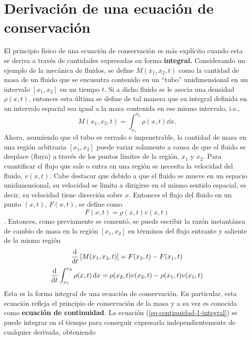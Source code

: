 \section{Derivación de una ecuación de conservación}
\label{sec:derivacion-continuidad}
El principio físico de una ecuación de conservación es más explícito cuando esta se deriva a través de cantidades expresadas en forma \textbf{integral.} Considerando un ejemplo de la mecánica de fluidos, se define $M(x_1,x_2,t)$ como la cantidad de masa de un fluido que se encuentra contenido en un ``tubo'' unidimensional en un intervalo  $[x_1,x_2]$ en un tiempo $t$. Si a dicho fluido se le asocia una densidad $\rho(x,t)$, entonces esta última se define de tal manera que su integral definida en un intervalo espacial sea igual a la masa contenida en ese mismo intervalo, i.e.,
\begin{equation}
	M(x_1, x_2, t) = \int_{x_1}^{x_2}\rho(x,t)\dd{x}.
\end{equation}
Ahora, asumiendo que el tubo es cerrado e impenetrable, la cantidad de masa en una región arbitraria $[x_1,x_2]$ puede variar solamente a causa de que el fluido se desplace (fluya) a través de los puntos límites de la región, $x_1$ y $x_2$. Para cuantificar el flujo que sale o entra en una región se necesita la velocidad del fluido, $v(x,t)$. Cabe destacar que debido a que el fluido se mueve en un espacio unidimensional, su velocidad se limita a dirigirse en el mismo sentido espacial, es decir, su velocidad tiene dirección sobre $x$. Entonces el flujo del fluido en un punto $(x,t)$, $F(x,t)$, se define como 
\begin{equation}
	F(x,t) = \rho(x,t)v(x,t)
\end{equation}.
Entonces, como previamente se comentó, se puede escribir la razón instantánea de cambio de masa en la región $[x_1,x_2]$ en términos del flujo entrante y saliente de la misma región
\begin{equation}
	\dv{t}	\left[M(x_1, x_2, t)\right] = F(x_2,t) - F(x_1,t)
\end{equation}
\begin{equation}
	\dv{t}	\int_{x_1}^{x_2}\rho(x,t)\dd{x} = \rho(x_2,t)v(x_2,t) - \rho(x_1,t)v(x_1,t)
	\label{eq:continuidad-1-integral}
\end{equation}
Esta es la forma integral de una ecuación de conservación. En particular, esta ecuación refleja el principio de conservación de la masa y a su vez es conocida como \textbf{ecuación de continuidad}. La ecuación (\ref{eq:continuidad-1-integral}) se puede integrar en el tiempo para conseguir expresarla independientemente de cualquier derivada, obteniendo

